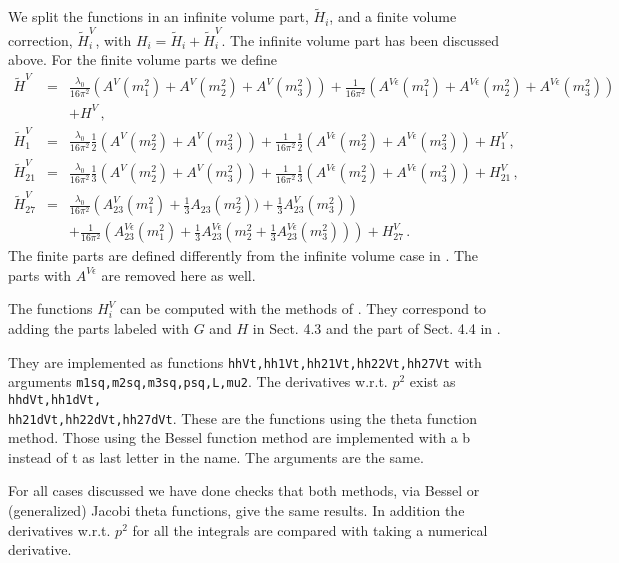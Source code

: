 \documentclass[12pt,a4paper]{article}
\begin{document}
We split the functions in an infinite volume part, $\tilde H_i$, and a finite
volume correction, $\tilde H^V_i$, with
$H_i=\tilde H_i+\tilde H^V_i$. The infinite volume part has been
discussed above.
For the finite volume parts we define
\begin{eqnarray}
\tilde H^V &=& \frac{\lambda_0}{16\pi^2}
 \left(A^V(m_1^2)+A^V(m_2^2)+A^V(m_3^2)\right)
 +\frac{1}{16\pi^2}
    \left(A^{V\epsilon}(m_1^2)+A^{V\epsilon}(m_2^2)+A^{V\epsilon}(m_3^2)\right)
\nonumber\\&&
 +H^V\,,
\nonumber\\
\tilde H^V_1 &=& \frac{\lambda_0}{16\pi^2}\frac{1}{2}
 \left(A^V(m_2^2)+A^V(m_3^2)\right)
 +\frac{1}{16\pi^2}\frac{1}{2}
    \left(A^{V\epsilon}(m_2^2)+A^{V\epsilon}(m_3^2)\right)
 +H^V_1\,,
\nonumber\\
\tilde H^V_{21} &=& \frac{\lambda_0}{16\pi^2}\frac{1}{3}
 \left(A^V(m_2^2)+A^V(m_3^2)\right)
 +\frac{1}{16\pi^2}\frac{1}{3}
    \left(A^{V\epsilon}(m_2^2)+A^{V\epsilon}(m_3^2)\right)
 +H^V_{21}\,,
\nonumber\\
\tilde H^V_{27} &=& \frac{\lambda_0}{16\pi^2}
 \left(A^V_{23}(m_1^2)+\frac{1}{3}A_{23}(m_2^2))+\frac{1}{3}A^V_{23}(m_3^2)\right)
\nonumber\\&&
 +\frac{1}{16\pi^2}
    \left(A^{V\epsilon}_{23}(m_1^2)
+\frac{1}{3}A^{V\epsilon}_{23}(m_2^2+\frac{1}{3}A^{V\epsilon}_{23}(m_3^2))\right)
 +H^V_{27}\,.
\end{eqnarray}
The finite parts are defined differently from the
infinite volume case in \cite{Amoros:1999dp}.
The parts with $A^{V\epsilon}$ are removed here as well.

The functions $H^V_i$ can be computed with the methods
of \cite{Bijnens:2013doa}.
They correspond to adding the parts labeled with $G$ and $H$ in Sect. 4.3 and
the part of Sect. 4.4 in \cite{Bijnens:2013doa}.

They are implemented as functions \texttt{hhVt,hh1Vt,hh21Vt,hh22Vt,hh27Vt}
with arguments \texttt{m1sq,m2sq,m3sq,psq,L,mu2}.
The derivatives w.r.t. $p^2$ exist as
\texttt{hhdVt,hh1dVt,\\hh21dVt,hh22dVt,hh27dVt}.
These are the functions using the theta function method. Those using
the Bessel function method are implemented with a b instead of t as last letter
in the name. The arguments are the same.

For all cases discussed we have done checks that both methods, via Bessel or
(generalized) Jacobi theta functions, give the same results.
In addition the derivatives w.r.t. $p^2$ for all the integrals
are compared with taking a numerical derivative.
\end{document}
